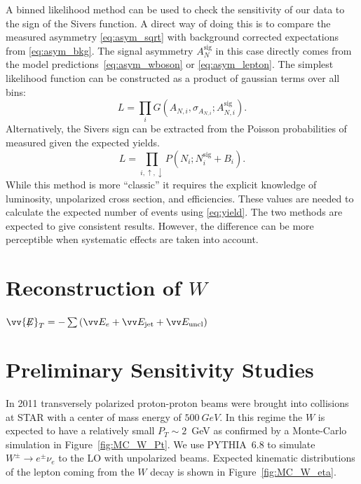 \documentclass[12pt]{article}
\newcommand{\missET}{\vv{\not{\!\!E}}_T}
\begin{document}
A binned likelihood method can be used to check the sensitivity of our data to
the sign of the Sivers function. A direct way of doing this is to compare the
measured asymmetry \eqref{eq:asym_sqrt} with background corrected expectations
from \eqref{eq:asym_bkg}. The signal asymmetry $A^\text{sig}_N$ in this case
directly comes from the model predictions~\eqref{eq:asym_wboson} or
\eqref{eq:asym_lepton}. The simplest likelihood function can be constructed as a
product of gaussian terms over all bins:
%
\begin{equation}
L = \prod\limits_i G(A_{N,i}, \sigma_{A_{N,i}}; A^\text{sig}_{N,i}).
\end{equation}
%
Alternatively, the Sivers sign can be extracted from the Poisson probabilities
of measured given the expected yields.
%
\begin{equation}
L = \prod\limits_{i,\uparrow,\downarrow} P(N_i; N^\text{sig}_{i} + B_i).
\end{equation}
%
While this method is more ``classic'' it requires the explicit knowledge of
luminosity, unpolarized cross section, and efficiencies. These values are
needed to calculate the expected number of events using \eqref{eq:yield}. The
two methods are expected to give consistent results. However, the difference
can be more perceptible when systematic effects are taken into account.



\section{Reconstruction of $W$}

$\missET = - \sum \left( \vv E_e + \vv E_\text{jet} +  \vv E_\text{uncl} \right)$


\section{Preliminary Sensitivity Studies}

In 2011 transversely polarized proton-proton beams were brought into collisions
at STAR with a center of mass energy of $500~GeV$. In this regime the $W$ is
expected to have a relatively small $P_T \sim 2$~GeV as confirmed by a
Monte-Carlo simulation in Figure~\ref{fig:MC_W_Pt}. We use PYTHIA~6.8 to
simulate $W^\pm \to e^\pm \nu_e$ to the LO with unpolarized beams. Expected
kinematic distributions of the lepton coming from the $W$ decay is shown in
Figure~\ref{fig:MC_W_eta}.
\end{document}
